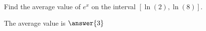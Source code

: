 \documentclass{ximera}
\author{Steven Gubkin}
\begin{document}
\begin{exercise}



Find the average value of $e^x$ on the interval $[\ln(2),\ln(8)]$.

\begin{prompt}
	The average value is $\answer{3}$
\end{prompt}

\end{exercise}
\end{document}
